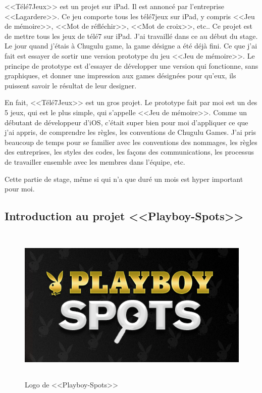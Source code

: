 <<Télé7Jeux>> est un projet sur iPad. Il est annoncé par l'entreprise <<Lagardere>>. Ce jeu comporte tous les télé7jeux sur iPad, y compris <<Jeu de mémoire>>, <<Mot de réfléchir>>, <<Mot de croix>>, etc.. Ce projet est de mettre tous les jeux de télé7 sur iPad.
J'ai travaillé dans ce au début du stage. Le jour quand j'étais à Chugulu game, la game désigne a été déjà fini. Ce que j'ai fait est essayer de sortir une version prototype du jeu <<Jeu de mémoire>>. Le principe de prototype est d'essayer de développer une version qui fonctionne, sans graphiques, et donner une impression aux games désignées pour qu'eux, ils puissent savoir le résultat de leur designer. 


En fait, <<Télé7Jeux>> est un gros projet. Le prototype fait par moi est un des 5 jeux, qui est le plus simple, qui s'appelle <<Jeu de mémoire>>. Comme un débutant de développeur d'iOS, c'était super bien pour moi d'appliquer ce que j'ai appris, de comprendre les règles, les conventions de Chugulu Games. J'ai pris beaucoup de temps pour se familier avec les conventions des nommages, les règles des entreprises, les styles des codes, les façons des communications, les processus de travailler ensemble avec les membres dans l'équipe, etc. 

Cette partie de stage, même si qui n'a que duré un mois est hyper important pour moi.


\subsection{Introduction au projet <<Playboy-Spots>>} %


\begin{figure}[htbp]
	\centering
		\includegraphics[height=3in]{Image/logoPlayboy.png}
	\caption{Logo de <<Playboy-Spots>>}
	\label{fig:Image_logoPlayboy}
\end{figure}




